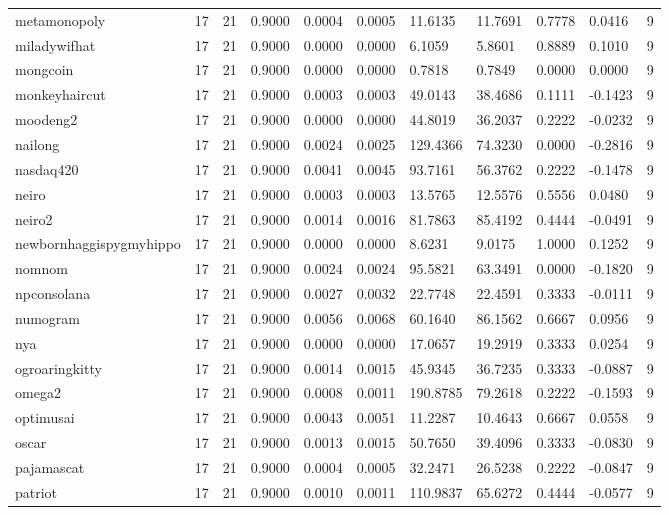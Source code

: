 \begin{table}[htbp]
\begin{tabular}{lllllllllll}
metamonopoly & 17 & 21 & 0.9000 & 0.0004 & 0.0005 & 11.6135 & 11.7691 & 0.7778 & 0.0416 & 9 \\
miladywifhat & 17 & 21 & 0.9000 & 0.0000 & 0.0000 & 6.1059 & 5.8601 & 0.8889 & 0.1010 & 9 \\
mongcoin & 17 & 21 & 0.9000 & 0.0000 & 0.0000 & 0.7818 & 0.7849 & 0.0000 & 0.0000 & 9 \\
monkeyhaircut & 17 & 21 & 0.9000 & 0.0003 & 0.0003 & 49.0143 & 38.4686 & 0.1111 & -0.1423 & 9 \\
moodeng2 & 17 & 21 & 0.9000 & 0.0000 & 0.0000 & 44.8019 & 36.2037 & 0.2222 & -0.0232 & 9 \\
nailong & 17 & 21 & 0.9000 & 0.0024 & 0.0025 & 129.4366 & 74.3230 & 0.0000 & -0.2816 & 9 \\
nasdaq420 & 17 & 21 & 0.9000 & 0.0041 & 0.0045 & 93.7161 & 56.3762 & 0.2222 & -0.1478 & 9 \\
neiro & 17 & 21 & 0.9000 & 0.0003 & 0.0003 & 13.5765 & 12.5576 & 0.5556 & 0.0480 & 9 \\
neiro2 & 17 & 21 & 0.9000 & 0.0014 & 0.0016 & 81.7863 & 85.4192 & 0.4444 & -0.0491 & 9 \\
newbornhaggispygmyhippo & 17 & 21 & 0.9000 & 0.0000 & 0.0000 & 8.6231 & 9.0175 & 1.0000 & 0.1252 & 9 \\
nomnom & 17 & 21 & 0.9000 & 0.0024 & 0.0024 & 95.5821 & 63.3491 & 0.0000 & -0.1820 & 9 \\
npconsolana & 17 & 21 & 0.9000 & 0.0027 & 0.0032 & 22.7748 & 22.4591 & 0.3333 & -0.0111 & 9 \\
numogram & 17 & 21 & 0.9000 & 0.0056 & 0.0068 & 60.1640 & 86.1562 & 0.6667 & 0.0956 & 9 \\
nya & 17 & 21 & 0.9000 & 0.0000 & 0.0000 & 17.0657 & 19.2919 & 0.3333 & 0.0254 & 9 \\
ogroaringkitty & 17 & 21 & 0.9000 & 0.0014 & 0.0015 & 45.9345 & 36.7235 & 0.3333 & -0.0887 & 9 \\
omega2 & 17 & 21 & 0.9000 & 0.0008 & 0.0011 & 190.8785 & 79.2618 & 0.2222 & -0.1593 & 9 \\
optimusai & 17 & 21 & 0.9000 & 0.0043 & 0.0051 & 11.2287 & 10.4643 & 0.6667 & 0.0558 & 9 \\
oscar & 17 & 21 & 0.9000 & 0.0013 & 0.0015 & 50.7650 & 39.4096 & 0.3333 & -0.0830 & 9 \\
pajamascat & 17 & 21 & 0.9000 & 0.0004 & 0.0005 & 32.2471 & 26.5238 & 0.2222 & -0.0847 & 9 \\
patriot & 17 & 21 & 0.9000 & 0.0010 & 0.0011 & 110.9837 & 65.6272 & 0.4444 & -0.0577 & 9 \\

\end{tabular}
\end{table}
